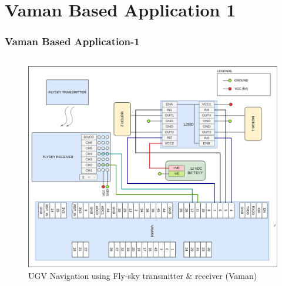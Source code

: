 \documentclass{beamer}
\begin{document}
\section{Vaman Based Application 1}
\begin{frame}
\frametitle{Vaman Based Application-1}
\begin{columns}
	\begin{figure}[h!]
  		\centering
  		\includegraphics[width=\linewidth]{./figs/Wiring_UGV_flysky_Vaman.png}
  		\caption{UGV Navigation using Fly-sky transmitter \& receiver (Vaman)}
  		\label{Wiring_UGV_flysky_Vaman}
	\end{figure}
\end{columns}
\end{frame}
\end{document}
